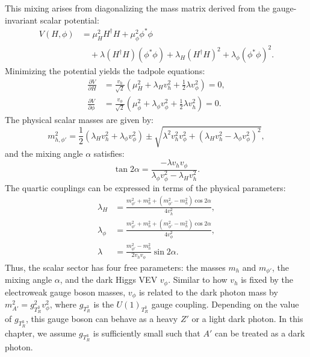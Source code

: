 This mixing arises from diagonalizing the mass matrix derived from the gauge-invariant scalar potential:
\begin{equation}
    \begin{aligned}
        V(H, \phi) &= \mu_H^2 H^\dagger H + \mu_\phi^2 \phi^* \phi \\
                    &\quad + \lambda (H^\dagger H)(\phi^* \phi) + \lambda_H (H^\dagger H)^2 + \lambda_\phi (\phi^* \phi)^2.
    \end{aligned}
\end{equation}
Minimizing the potential yields the tadpole equations:
\begin{align}
    \frac{\partial V}{\partial H} &= \frac{v_h}{\sqrt{2}} \left( \mu_H^2 + \lambda_H v_h^2 + \frac{1}{2} \lambda v_\phi^2 \right) = 0, \\
    \frac{\partial V}{\partial \phi} &= \frac{v_\phi}{\sqrt{2}} \left( \mu_\phi^2 + \lambda_\phi v_\phi^2 + \frac{1}{2} \lambda v_h^2 \right) = 0.
\end{align}
The physical scalar masses are given by:
\begin{equation}
    m_{h,\phi'}^2 = \frac{1}{2} \left( \lambda_H v_h^2 + \lambda_\phi v_\phi^2 \right) \pm \sqrt{ \lambda^2 v_h^2 v_\phi^2 + \left( \lambda_H v_h^2 - \lambda_\phi v_\phi^2 \right)^2 },
\end{equation}
and the mixing angle $\alpha$ satisfies:
\begin{equation}
    \tan 2\alpha = \frac{-\lambda v_h v_\phi}{ \lambda_\phi v_\phi^2 - \lambda_H v_h^2}.
\end{equation}
The quartic couplings can be expressed in terms of the physical parameters:
\begin{align}
  \lambda_H &= \frac{m_{\phi'}^2 + m_h^2 + (m_{\phi'}^2 - m_h^2)\cos 2\alpha}{4 v_h^2}, \\
  \lambda_\phi &= \frac{m_{\phi'}^2 + m_h^2 + (m_{\phi'}^2 - m_h^2)\cos 2\alpha}{4 v_\phi^2}, \\
  \lambda &= \frac{m_{\phi'}^2 - m_h^2}{2 v_h v_\phi} \sin 2\alpha.
\end{align}
Thus, the scalar sector has four free parameters: the masses $m_h$ and $m_{\phi'}$, the mixing angle $\alpha$, and the dark Higgs VEV $v_\phi$. Similar to how $v_h$ is fixed by the electroweak gauge boson masses, $v_\phi$ is related to the dark photon mass by $m_{A'}^2 = g_{T^3_R}^2 v_\phi^2$, where $g_{T^3_R}$ is the $U(1)_{T^3_R}$ gauge coupling. Depending on the value of $g_{T^3_R}$, this gauge boson can behave as a heavy $Z'$ or a light dark photon. In this chapter, we assume $g_{T^3_R}$ is sufficiently small such that $A'$ can be treated as a dark photon.

